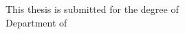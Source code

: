 \begin{titlepage}
    \begin{addmargin}[-1cm]{-3cm}
    \begin{center}
        \large  

        \hfill

        \vfill

        \begingroup
            \color{Maroon}\spacedallcaps{\myTitle} \\ \bigskip
        \endgroup

        \spacedlowsmallcaps{\myName}

        \vfill


        \mySubtitle \\ \bigskip  
        This thesis is submitted for the degree of \myDegree \\
        Department of \myDepartment \\   
        \myCollege \\
        \myUni \\ \bigskip

        \myTime\ 

        \vfill                      

    \end{center}  
  \end{addmargin}       
\end{titlepage}   